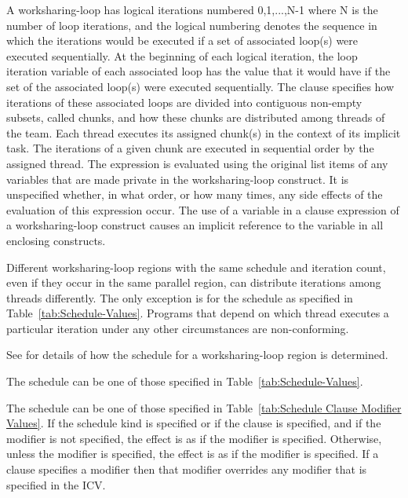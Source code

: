  A worksharing-loop has
logical iterations numbered 0,1,...,N-1 where N is the number of loop
iterations, and the logical numbering denotes the sequence in which
the iterations would be executed if a set of associated loop(s) were
executed sequentially.  At the beginning of each logical iteration,
the loop iteration variable of each associated loop has the value that
it would have if the set of the associated loop(s) were executed
sequentially.  The  clause specifies how iterations of
these associated loops are divided into contiguous non-empty subsets,
called chunks, and how these chunks are distributed among threads of
the team. Each thread executes its assigned chunk(s) in the context of
its implicit task.  The iterations of a given chunk are executed in
sequential order by the assigned thread.  The 
expression is evaluated using the original list items of any variables
that are made private in the worksharing-loop construct. It is unspecified
whether, in what order, or how many times, any side effects of the
evaluation of this expression occur. The use of a variable in a
 clause expression of a worksharing-loop construct causes an
implicit reference to the variable in all enclosing constructs.

Different worksharing-loop regions with the same schedule and iteration count, 
even if they occur in the same parallel region, can distribute iterations among
threads differently. The only exception is for the  schedule
as specified in Table~\ref{tab:Schedule-Values}. Programs that depend
on which thread executes a particular iteration under any other circumstances
are non-conforming.

See 
for details of how the schedule for a worksharing-loop region is
determined.

The schedule  can be one of those specified in
Table~\ref{tab:Schedule-Values}.

The schedule  can be one of those specified in
Table~\ref{tab:Schedule Clause Modifier Values}. If the
 schedule kind is specified or if the 
clause is specified, and if the  modifier is
not specified, the effect is as if the  modifier
is specified. Otherwise, unless the  modifier is
specified, the effect is as if the  modifier
is specified.
If a  clause specifies a modifier then that modifier overrides
any modifier that is specified in the  ICV.

